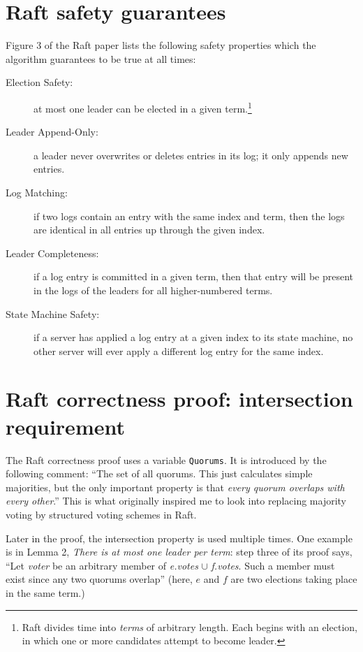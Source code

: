 \documentclass[12pt,chapterprefix=true,toc=bibliography,numbers=noendperiod,
               footnotes=multiple,twoside]{scrreprt}
\begin{document}
\section{Raft safety guarantees}
\label{sc:rafter-safety}

Figure 3 of the Raft paper lists the following safety properties which the algorithm guarantees to be true at all times:\autocite{raft}

\begin{description}
    \item[Election Safety:] at most one leader can be elected in a given term.\footnote{Raft divides time into \emph{terms} of arbitrary length. Each begins with an election, in which one or more candidates attempt to become leader.}
    \item[Leader Append-Only:] a leader never overwrites or deletes entries in its log; it only appends new entries.
    \item[Log Matching:] if two logs contain an entry with the same index and term, then the logs are identical in all entries up through the given index.
    \item[Leader Completeness:] if a log entry is committed in a given term, then that entry will be present in the logs of the leaders for all higher-numbered terms.
    \item[State Machine Safety:] if a server has applied a log entry at a given index to its state machine, no other server will ever apply a different log entry for the same index.
\end{description}

\section{Raft correctness proof: intersection requirement}
\label{sc:rafter-proof}

The Raft correctness proof uses a variable \texttt{Quorums}. It is introduced by the following comment: \enquote{The set of all quorums. This just calculates simple majorities, but the only important property is that \emph{every quorum overlaps with every other}.} This is what originally inspired me to look into replacing majority voting by structured voting schemes in Raft.

Later in the proof, the intersection property is used multiple times. One example is in Lemma 2, \emph{There is at most one leader per term}: step three of its proof says, \enquote{Let \textit{voter} be an arbitrary member of \textit{e.votes} \(\cup\) \textit{f.votes}. Such a member must exist since any two quorums overlap} (here, \(e\) and \(f\) are two elections taking place in the same term.)
\end{document}
